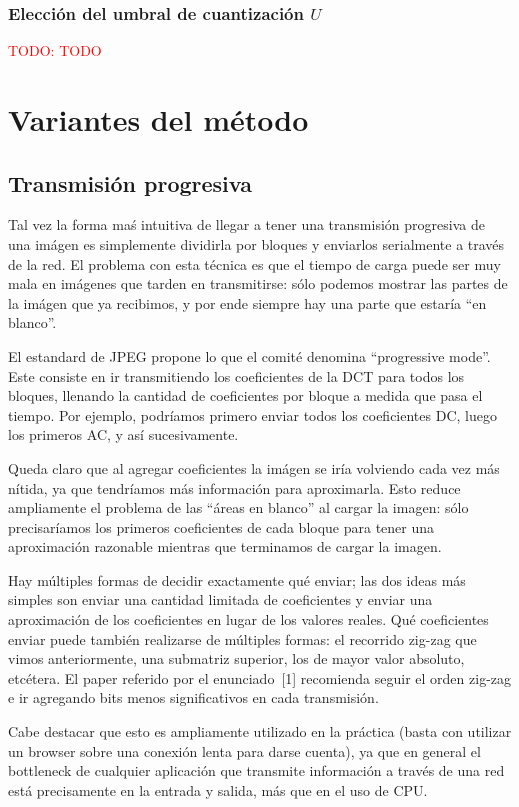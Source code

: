 \documentclass{article}
\newcommand{\TODO}[1]{\textcolor{red}{TODO: #1}}
\begin{document}
\subsubsection{Elección del umbral de cuantización $U$}

\TODO{TODO}

\section{Variantes del método}

\subsection{Transmisión progresiva}

Tal vez la forma maś intuitiva de llegar a tener una transmisión progresiva de una imágen es simplemente dividirla por bloques y enviarlos serialmente a través de la red. El problema con esta técnica es que el tiempo de carga puede ser muy mala en imágenes que tarden en transmitirse: sólo podemos mostrar las partes de la imágen que ya recibimos, y por ende siempre hay una parte que estaría ``en blanco''.

El estandard de JPEG propone lo que el comité denomina ``progressive mode''. Este consiste en ir transmitiendo los coeficientes de la DCT para todos los bloques, llenando la cantidad de coeficientes por bloque a medida que pasa el tiempo. Por ejemplo, podríamos primero enviar todos los coeficientes DC, luego los primeros AC, y así sucesivamente.

Queda claro que al agregar coeficientes la imágen se iría volviendo cada vez más nítida, ya que tendríamos más información para aproximarla. Esto reduce ampliamente el problema de las ``áreas en blanco'' al cargar la imagen: sólo precisaríamos los primeros coeficientes de cada bloque para tener una aproximación razonable mientras que terminamos de cargar la imagen.

Hay múltiples formas de decidir exactamente qué enviar; las dos ideas más simples son enviar una cantidad limitada de coeficientes y enviar una aproximación de los coeficientes en lugar de los valores reales. Qué coeficientes enviar puede también realizarse de múltiples formas: el recorrido zig-zag que vimos anteriormente, una submatriz superior, los de mayor valor absoluto, etcétera. El paper referido por el enunciado~[1] recomienda seguir el orden zig-zag e ir agregando bits menos significativos en cada transmisión.

Cabe destacar que esto es ampliamente utilizado en la práctica (basta con utilizar un browser sobre una conexión lenta para darse cuenta), ya que en general el bottleneck de cualquier aplicación que transmite información a través de una red está precisamente en la entrada y salida, más que en el uso de CPU.
\end{document}
